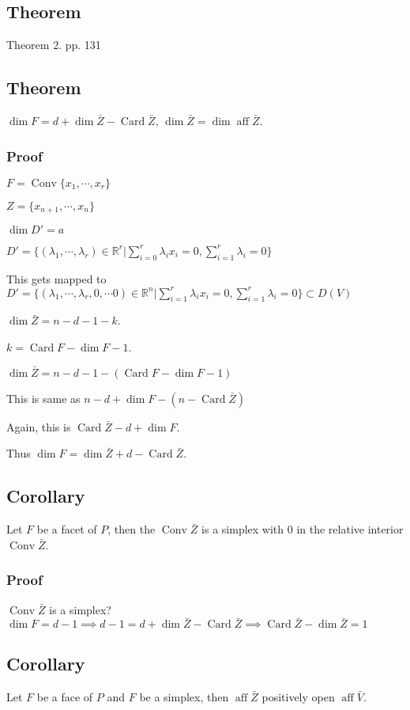\documentclass[11pt]{article}
\def\R{\mathbb{R}}
\def\aff{\operatorname{aff}}
\def\conv{\operatorname{Conv}}
\def\card{\operatorname{Card}}
\begin{document}
{{{\subsection{Theorem}
\label{sec:orgafcac16}
Theorem 2. pp. 131
\subsection{Theorem}
\label{sec:org7c18154}
\(\dim F = d + \dim \bar{Z} - \card{\bar{Z}}\), \(\dim \bar{Z} = \dim \aff \bar{Z}\).
\subsubsection{Proof}
\label{sec:org6074152}
\(F = \conv \{x_1, \cdots, x_r\}\)

\(Z = \{x_{n+1}, \cdots, x_n\}\)

\(\dim D' = a\)

\(D' = \{(\lambda_1, \cdots, \lambda_r) \in \R^r \vert \sum_{i=0}^{r}
    \lambda_i x_i = 0, \sum_{i=1}^{r} \lambda_i = 0\}\)

This gets mapped to \(D' = \{(\lambda_1, \cdots, \lambda_r, 0, \cdots 0) \in
    \R^n \vert \sum_{i=1}^{r} \lambda_i x_i = 0, \sum_{i=1}^{r} \lambda_i = 0\}
    \subset D(V)\)

\(\dim \bar{Z} = n - d- 1- k\).

\(k = \card F - \dim F - 1\).

\(\dim \bar{Z} = n - d- 1 - (\card F - \dim F - 1)\)

This is same as \(n - d + \dim F - (n - \card \bar{Z})\)

Again, this is \(\card \bar{Z} - d + \dim F\).

Thus \(\dim F = \dim \bar{Z} + d - \card\bar{Z}\).
\subsection{Corollary}
\label{sec:orge355bb2}
Let \(F\) be a facet of \(P\), then the \(\conv \bar{Z}\) is a simplex with \(0\) in
the relative interior \(\conv \bar{Z}\).
\subsubsection{Proof}
\label{sec:org4b99a4c}
\(\conv \bar{Z}\) is a simplex? \(\dim F = d - 1\implies d- 1 = d + \dim
    \bar{Z} - \card \bar{Z} \implies \card \bar{Z} - \dim \bar{Z} = 1\)
\subsection{Corollary}
\label{sec:org8147915}
Let \(F\) be a face of \(P\) and \(F\) be a simplex, then \(\aff \bar{Z}\) positively
open \(\aff \bar{V}\).
}}}
\end{document}
